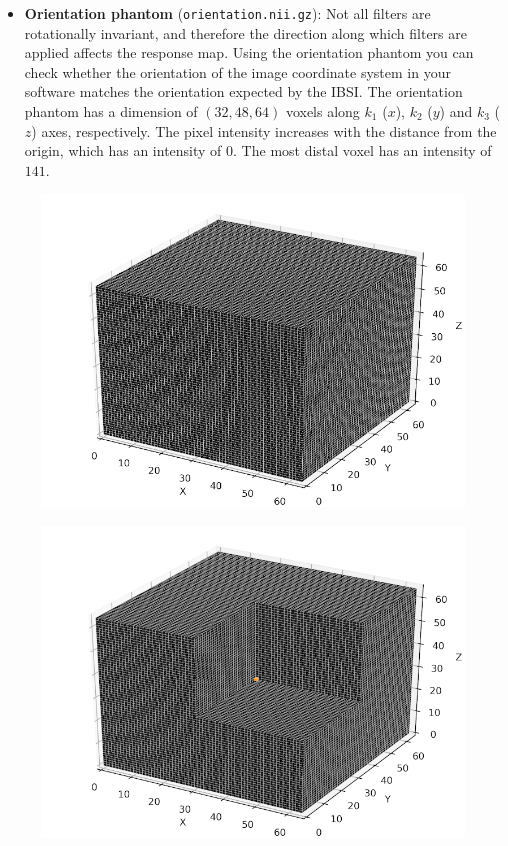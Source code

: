 \documentclass[fleqn,a4paper,oneside,openany]{book}
\begin{document}
\begin{itemize}
    \item \textbf{Orientation phantom} (\texttt{orientation.nii.gz}): Not all filters are rotationally invariant, and therefore the direction along which filters are applied affects the response map. Using the orientation phantom you can check whether the orientation of the image coordinate system in your software matches the orientation expected by the IBSI. The orientation phantom has a dimension of $(32, 48, 64)$ voxels along $k_1$ ($x$), $k_2$ ($y$) and $k_3$ ($z$) axes, respectively. The pixel intensity increases with the distance from the origin, which has an intensity of $0$. The most distal voxel has an intensity of $141$.
\end{itemize}


\begin{figure}
\centering
   \begin{minipage}[b]{145pt}
     \centering
     \includegraphics[trim = 0 0 0 0, clip, width=\linewidth] {phantom_figures/empty.png}
     \label{fig:phantom_empty}
     \hspace{100pt}
   \end{minipage}
   \begin{minipage}[b]{145pt}
     \centering
     \includegraphics[trim = 0 0 0 0, clip, width=\linewidth] {phantom_figures/response.png}

\end{minipage}
\end{figure}
\end{document}
